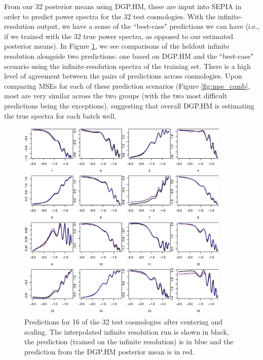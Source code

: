 \documentclass[11pt]{article}
\begin{document}
From our 32 posterior means using DGP.HM, these are input into SEPIA in order to predict power spectra
for the 32 test cosmologies. With the infinite-resolution output, we have a sense of the ``best-case" 
predictions we can have (i.e., if we trained with the 32 true power spectra, as opposed to our 
estimated posterior means). In Figure \ref{fig:pca_preds_v_camb}, we see comparisons of the heldout 
infinite resolution alongside two predictions: one based on DGP.HM and the ``best-case" scenario using the
infinite-resolution spectra of the training set. There is a high level of agreement between the pairs
of predictions across cosmologies. Upon comparing MSEs for each of these prediction scenarios 
(Figure \ref{fig:mse_camb}, most are very similar across the two groups (with the two most difficult 
predictions being the exceptions), suggesting that overall DGP.HM is estimating the true spectra 
for each batch well.

\begin{figure}
    \centering
    \includegraphics[width=4in]{preds_diff1_4_8.jpg}
    \caption{Predictions for 16 of the 32 test cosmologies after centering and scaling. 
             The interpolated infinite resolution run is shown in black, the prediction 
             (trained on the infinite resolution) is in blue and the prediction from 
             the DGP.HM posterior mean is in red.}   
    \label{fig:pca_preds_v_camb}
\end{figure}
\end{document}
